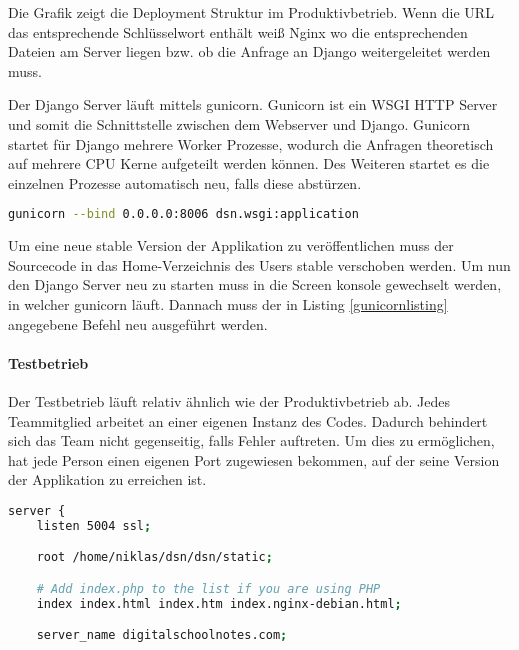 
Die Grafik zeigt die Deployment Struktur im Produktivbetrieb. Wenn die URL das entsprechende Schlüsselwort enthält weiß Nginx wo die entsprechenden Dateien am Server liegen bzw. ob die Anfrage an Django weitergeleitet werden muss.

Der Django Server läuft mittels gunicorn. Gunicorn ist ein \gls{WSGI} HTTP Server und somit die Schnittstelle zwischen dem Webserver und Django. Gunicorn startet für Django mehrere Worker Prozesse, wodurch die Anfragen theoretisch auf mehrere CPU Kerne aufgeteilt werden können. Des Weiteren startet es die einzelnen Prozesse automatisch neu, falls diese abstürzen. \cite{GUNICORN}

\begin{lstlisting}[caption = Gunicorn Startbefehl, label = gunicornlisting, language=bash]
gunicorn --bind 0.0.0.0:8006 dsn.wsgi:application
\end{lstlisting}

Um eine neue stable Version der Applikation zu veröffentlichen muss der Sourcecode in das Home-Verzeichnis des Users stable verschoben werden. Um nun den Django Server neu zu starten muss in die Screen konsole gewechselt werden, in welcher gunicorn läuft. Dannach muss der in Listing \ref{gunicornlisting} angegebene Befehl neu ausgeführt werden.

\paragraph{Testbetrieb}
Der Testbetrieb läuft relativ ähnlich wie der Produktivbetrieb ab. Jedes Teammitglied arbeitet an einer eigenen Instanz des Codes. Dadurch behindert sich das Team nicht gegenseitig, falls Fehler auftreten. Um dies zu ermöglichen, hat jede Person einen eigenen Port zugewiesen bekommen, auf der seine Version der Applikation zu erreichen ist. 

\begin{lstlisting}[caption = Auszuge einer Testbetrieb Nginx Konfiguration, label = gunicornlisting, language=bash]
server {
	listen 5004 ssl;

	root /home/niklas/dsn/dsn/static;

	# Add index.php to the list if you are using PHP
	index index.html index.htm index.nginx-debian.html;

	server_name digitalschoolnotes.com;

\end{lstlisting}

